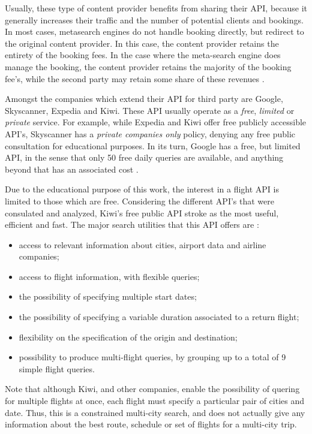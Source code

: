 Usually, these type of content provider benefits from sharing their API, because it generally
increases their traffic and the number of potential clients and bookings. In most cases, metasearch
engines do not handle booking directly, but redirect to the original content provider. In
this case, the content provider retains the entirety of the booking fees. In the case where the
meta-search engine does manage the booking, the content provider retains the majority of the
booking fee’s, while the second party may retain some share of these revenues \cite{skyscanner_pricing}.

Amongst the companies which extend their API for third party are Google, Skyscanner, Expedia and Kiwi.
These API usually operate as a \textit{free}, \textit{limited} or \textit{private} service.
For example, while Expedia and Kiwi offer free publicly accessible API's,
Skyscanner has a \textit{private companies only} \cite{skyscanner_private} policy, denying any free public consultation for educational purposes.
In its turn, Google has a free, but limited API, in the sense that only 50 free daily queries are available,
and anything beyond that has an associated cost \cite{google_qpx}.

Due to the educational purpose of this work, the interest in a flight API is limited to those which are free.
Considering the different API's that were consulated and analyzed, Kiwi's free public API stroke as the most useful, efficient and fast.
The major search utilities that this API offers are \cite{kiwi_api}:
\begin{itemize}
  \item access to relevant information about cities, airport data and airline companies;
  \item access to flight information, with flexible queries;
  \item the possibility of specifying multiple start dates;
  \item the possibility of specifying a variable duration associated to a return flight;
  \item flexibility on the specification of the origin and destination;
  \item possibility to produce multi-flight queries, by grouping up to a total of 9 simple flight queries.
\end{itemize}

Note that although Kiwi, and other companies, enable the possibility of quering 
for multiple flights at once, each flight must specify a particular pair of cities and date.
Thus, this is a constrained multi-city search, and does not actually give 
any information about the best route, schedule or set of flights for a multi-city trip.  







